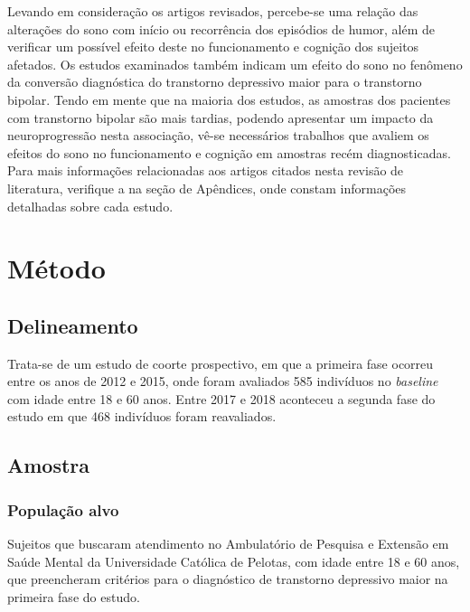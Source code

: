 \documentclass[chapter=TITLE,
               oneside,
               12pt,
               a4paper,
               english,
               brazil]{abntex2}    %
\begin{document}
        Levando em consideração os artigos revisados, percebe-se uma relação
        das alterações do sono com início ou recorrência dos episódios de humor,
        além de verificar um possível efeito deste no funcionamento e cognição
        dos sujeitos afetados.
        Os estudos examinados também indicam um efeito do sono no fenômeno
        da conversão diagnóstica do transtorno depressivo maior para o transtorno
        bipolar.
        Tendo em mente que na maioria dos estudos, as amostras dos pacientes
        com transtorno bipolar são mais tardias, podendo apresentar um impacto
        da neuroprogressão nesta associação, vê-se necessários trabalhos que
        avaliem os efeitos do sono no funcionamento e cognição em amostras recém
        diagnosticadas.
        Para mais informações relacionadas aos artigos citados nesta revisão
        de literatura, verifique a  na seção de Apêndices,
        onde constam informações detalhadas sobre cada estudo.

\vspace{\onelineskip}
\chapter{Método}\label{sec:metodo}

    \section{Delineamento}\label{sec:delineamento}

        Trata-se de um estudo de coorte prospectivo, em que a primeira fase ocorreu
        entre os anos de 2012 e 2015, onde foram avaliados 585 indivíduos no
        \textit{baseline} com idade entre 18 e 60 anos.
        Entre 2017 e 2018 aconteceu a segunda fase do estudo em que 468 indivíduos
        foram reavaliados.

    \section{Amostra}\label{sec:sujeitos}

        \subsection{População alvo}

            Sujeitos que buscaram atendimento no Ambulatório de Pesquisa e Extensão
            em Saúde Mental da Universidade Católica de Pelotas, com idade entre 18
            e 60 anos, que preencheram critérios para o diagnóstico de transtorno
            depressivo maior na primeira fase do estudo.
\end{document}
